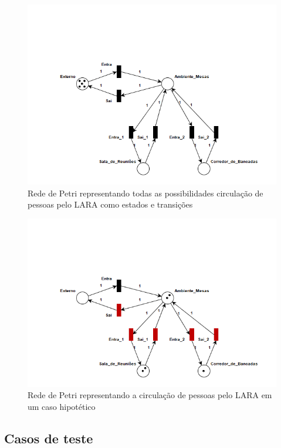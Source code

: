  
 
 \begin{figure}[H]
    \centering
    \includegraphics[width=0.8\linewidth]{figs/Metodologia/Petri_net.png}
    \caption{Rede de Petri representando todas as possibilidades circulação de pessoas pelo LARA como estados e transições}
    \label{fig:Petri1}
\end{figure}

 \begin{figure}[H]
    \centering
    \includegraphics[width=0.8\linewidth]{figs/Metodologia/Petri_net2.png}
    \caption{Rede de Petri representando a circulação de pessoas pelo LARA em um caso hipotético}
    \label{fig:Petri2}
\end{figure}
 
 

 
 
 
 
 \subsection{Casos de teste}
 
